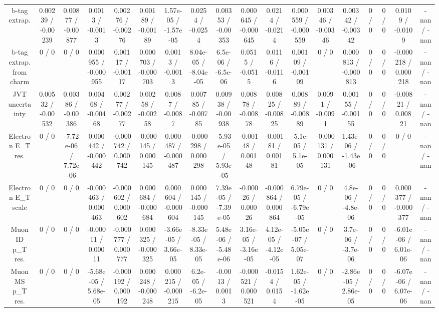 \documentclass[10pt]{article}
\begin{document}
\begin{table}[htbp]
\begin{center}
\begin{tabular}{|c|c|c|c|c|c|c|c|c|c|c|c|c|c|c|c|c|c|}
  b-tag extrap. & 0.00239 / -0.00239 & 0.00877 / -0.00877 & 0.0013 / -0.0013 & 0.00276 / -0.00276 & 0.00189 / -0.00189 & 1.57e-05 / -1.57e-05 & 0.0254 / -0.0254 & 0.00353 / -0.00353 & 0.000645 / -0.000645 & 0.0214 / -0.0214 & 0.000559 / -0.000559 & 0.00346 / -0.00346 & 0.00342 / -0.00342 & 0 / 0 & 0 / 0 & 0.0109 / -0.0109 & -nan / -nan \\ 
  b-tag extrap. from charm & 0 / 0 & 0 / 0 & 0.000955 / -0.000955 & 0.00117 / -0.00117 & 0.000703 / -0.000703 & 0.0013 / -0.0013 & 8.04e-05 / -8.04e-05 & 6.5e-06 / -6.5e-06 & 0.0515 / -0.0515 & 0.0116 / -0.0116 & 0.00109 / -0.00109 & 0 / 0 & 0.000813 / -0.000813 & 0 / 0 & 0 / 0 & -0.000218 / 0.000218 & -nan / -nan \\ 
  JVT uncertainty & 0.00532 / -0.00532 & 0.00386 / -0.00386 & 0.00468 / -0.00468 & 0.00277 / -0.00277 & 0.00258 / -0.00258 & 0.0087 / -0.0087 & 0.00785 / -0.00785 & 0.00938 / -0.00938 & 0.00878 / -0.00878 & 0.00825 / -0.00825 & 0.00889 / -0.00889 & 0.0091 / -0.0091 & 0.00155 / -0.00155 & 0 / 0 & 0 / 0 & -0.00821 / 0.00821 & -nan / -nan \\ 
  Electron E_{T} res. & 0 / 0 & -7.72e-06 / 7.72e-06 & 0.000442 / -0.000442 & -0.000742 / 0.000742 & -0.000145 / 0.000145 & 0.000487 / -0.000487 & -0.000298 / 0.000298 & -5.93e-05 / 5.93e-05 & -0.00148 / 0.00148 & -0.00181 / 0.00181 & -5.1e-05 / 5.1e-05 & -0.000131 / 0.000131 & 1.43e-06 / -1.43e-06 & 0 / 0 & 0 / 0 & 0 / 0 & -nan / -nan \\ 
  Electron E_{T} scale & 0 / 0 & 0 / 0 & -0.000463 / 0.000463 & -0.000602 / 0.000602 & 0.000684 / -0.000684 & 0.000604 / -0.000604 & 0.000145 / -0.000145 & 7.39e-05 / -7.39e-05 & -0.00026 / 0.00026 & -0.000864 / 0.000864 & 6.79e-05 / -6.79e-05 & 0 / 0 & 4.8e-06 / -4.8e-06 & 0 / 0 & 0 / 0 & 0.000377 / -0.000377 & -nan / -nan \\ 
  Muon ID p_{T} res. & 0 / 0 & 0 / 0 & -0.00011 / 0.00011 & -0.000777 / 0.000777 & 0.000325 / -0.000325 & -3.66e-05 / 3.66e-05 & -8.33e-05 / 8.33e-05 & 5.48e-06 / -5.48e-06 & 3.16e-05 / -3.16e-05 & 4.12e-05 / -4.12e-05 & -5.05e-07 / 5.05e-07 & 0 / 0 & 3.7e-06 / -3.7e-06 & 0 / 0 & 0 / 0 & -6.01e-06 / 6.01e-06 & -nan / -nan \\ 
  Muon MS p_{T} res. & 0 / 0 & 0 / 0 & -5.68e-05 / 5.68e-05 & -0.000192 / 0.000192 & 0.000248 / -0.000248 & 0.000215 / -0.000215 & 6.2e-05 / -6.2e-05 & -0.0013 / 0.0013 & -0.000521 / 0.000521 & -0.0154 / 0.0154 & 1.62e-05 / -1.62e-05 & 0 / 0 & -2.86e-05 / 2.86e-05 & 0 / 0 & 0 / 0 & -6.07e-06 / 6.07e-06 & -nan / -nan \\ 

\end{tabular}
\end{center}
\end{table}
\end{document}
